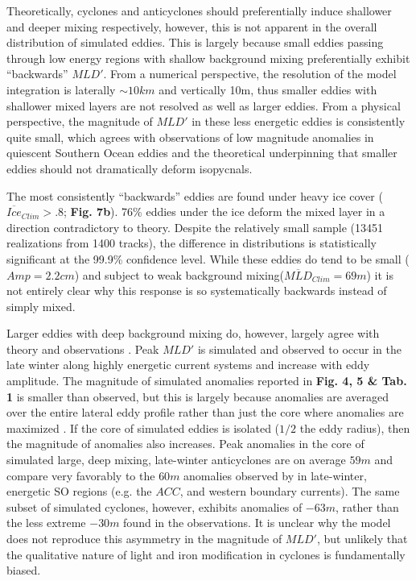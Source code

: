 \documentclass{article}
\begin{document}
Theoretically, cyclones and anticyclones should preferentially induce shallower and deeper mixing respectively, however, this is not apparent in the overall distribution of simulated eddies. This is largely because small eddies passing through low energy regions with shallow background mixing preferentially exhibit ``backwards'' $MLD'$. From a numerical perspective, the resolution of the model integration is laterally $\sim10km$ and vertically 10m, thus smaller eddies with shallower mixed layers are not resolved as well as larger eddies. From a physical perspective, the magnitude of $MLD'$ in these less energetic eddies is consistently quite small, which agrees with observations of low magnitude anomalies in quiescent Southern Ocean eddies \parencite{HausmannObservedmesoscaleeddy2017} and the theoretical underpinning that smaller eddies should not dramatically deform isopycnals. 

The most consistently ``backwards'' eddies are found under heavy ice cover ($\overline{Ice}_{Clim} >.8$; \textbf{Fig. 7b}). 76\% eddies under the ice deform the mixed layer in a direction contradictory to theory. Despite the relatively small sample (13451 realizations from 1400 tracks), the difference in distributions is statistically significant at the 99.9\% confidence level. While these eddies do tend to be small ($Amp = 2.2cm$) and subject to weak background mixing($\overline{MLD}_{Clim} =69m$) it is not entirely clear why this response is so systematically backwards instead of simply mixed. 

Larger eddies with deep background mixing do, however, largely agree with theory \parencite{McGillicuddyMechanismsPhysicalBiologicalBiogeochemicalInteraction2016} and observations \parencite{HausmannObservedmesoscaleeddy2017}. Peak $MLD'$ is simulated and observed \parencite{HausmannObservedmesoscaleeddy2017} to occur in the late winter along highly energetic current systems and increase with eddy amplitude. The magnitude of simulated anomalies reported in \textbf{Fig. 4, 5 \& Tab. 1} is smaller than observed, but this is largely because anomalies are averaged over the entire lateral eddy profile rather than just the core where anomalies are maximized \parencite{HausmannObservedmesoscaleeddy2017}. If the core of simulated eddies is isolated ($1/2$ the eddy radius), then the magnitude of anomalies also increases. Peak anomalies in the core of simulated large, deep mixing, late-winter anticyclones are on average $59m$ and compare very favorably to the $60m$ anomalies observed by \textcite{HausmannObservedmesoscaleeddy2017} in late-winter, energetic SO regions (e.g. the $ACC$, and western boundary currents). The same subset of simulated cyclones, however, exhibits anomalies of $-63m$, rather than the less extreme $-30m$ found in the observations.  It is unclear why the model does not reproduce this asymmetry in the magnitude of $MLD'$, but unlikely that the qualitative nature of light and iron modification in cyclones is fundamentally biased.  
    
\end{document}
